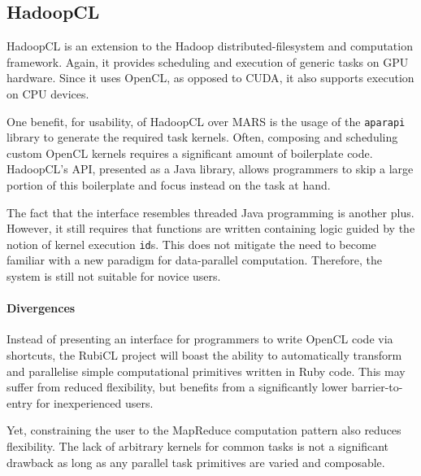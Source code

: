 \subsection{HadoopCL}
HadoopCL\cite{hadoopcl} is an extension to the Hadoop\cite{hadoop} distributed-filesystem and computation framework. Again, it provides scheduling and execution of generic tasks on  \ac{GPU} hardware. Since it uses \ac{OpenCL}, as opposed to \ac{CUDA}, it also supports execution on \ac{CPU} devices.

One benefit, for usability, of HadoopCL over MARS is the usage of the \verb|aparapi| library\cite{aparapi} to generate the required task kernels. Often, composing and scheduling custom \ac{OpenCL} kernels requires a significant amount of boilerplate code. HadoopCL's \ac{API}, presented as a Java library, allows programmers to skip a large portion of this boilerplate and focus instead on the task at hand.

The fact that the interface resembles threaded Java programming is another plus. However, it still requires that functions are written containing logic guided by the notion of kernel execution \verb|id|s. This does not mitigate the need to become familiar with a new paradigm for data-parallel computation. Therefore, the system is still not suitable for novice users.

\paragraph*{Divergences}
Instead of presenting an interface for programmers to write \ac{OpenCL} code via shortcuts, the RubiCL project will boast the ability to automatically transform and parallelise simple computational primitives written in Ruby code. This may suffer from reduced flexibility, but benefits from a significantly lower barrier-to-entry for inexperienced users.

Yet, constraining the user to the MapReduce computation pattern also reduces flexibility. The lack of arbitrary kernels for common tasks is not a significant drawback as long as any parallel task primitives are varied and composable.


